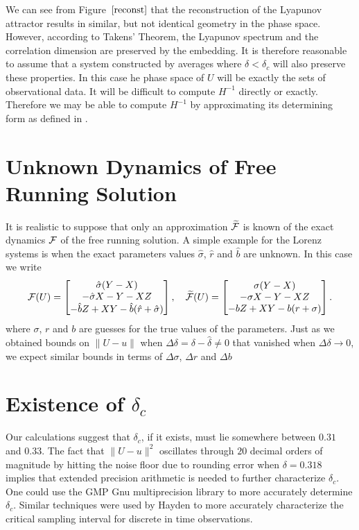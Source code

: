 \documentclass[master,tocprelim,12pt]{unrthesis}
\theoremstyle{definition}
\numberwithin{equation}{chapter}
\begin{document}
\begin{manuscript}
We can see from Figure~$\ref{reconst}$ that the reconstruction of the Lyapunov
attractor results in similar, but not identical geometry in the phase space. 
However, according to Takens' Theorem, the Lyapunov spectrum and the correlation
dimension are preserved by the embedding. It is therefore reasonable to assume
that a system constructed by averages where $\delta < \delta_c$ will also
preserve these properties. In this case he phase space of $U$ will be exactly
the sets of observational data. It will be difficult to compute $H^{-1}$
directly or exactly. Therefore we may be able to compute $H^{-1}$ by
approximating its determining form as defined in \cite{Jolly15}.

\section{Unknown Dynamics of Free Running Solution}
\label{whatissigma}
It is realistic to suppose that only an approximation $\widetilde{\cal F}$
is known of the exact dynamics ${\cal F}$ of the free running solution.
A simple example for the Lorenz systems is when
the exact parameters values $\hat\sigma$, $\hat r$ and $\hat b$ are 
unknown.
In this case we write
\begin{align*}
	{\cal F}(U)=
    \begin{bmatrix}\hat\sigma(Y-X)\\
    -\hat\sigma X-Y-XZ\\ -\hat bZ+XY-\hat b(\hat r+\hat\sigma)\end{bmatrix},
\quad
	\widetilde {\cal F}(U)=
    \begin{bmatrix}\sigma(Y-X)\\
    -\sigma X-Y-XZ\\ -bZ+XY-b(r+\sigma)\end{bmatrix}.
\end{align*}
where $\sigma$, $r$ and $b$ are guesses for the
true values of the parameters.  Just as we obtained bounds on
$\|U-u\|$ when $\Delta\delta=\delta-\hat\delta\ne 0$ that vanished when 
$\Delta\delta\to 0$, we expect similar bounds in terms of
$\Delta\sigma$, $\Delta r$ and $\Delta b$

\section{Existence of $\delta_c$}

Our calculations suggest that $\delta_c$, if it exists, must
lie somewhere between $0.31$ and $0.33$.  The fact that $\|U-u\|^2$
oscillates through $20$ decimal orders of magnitude by hitting
the noise floor due to rounding error when $\delta=0.318$ implies
that extended precision arithmetic is needed to further characterize
$\delta_c$.  One could use the GMP Gnu multiprecision library
to more accurately determine $\delta_c$.  Similar techniques were
used by Hayden \cite{HaydenThesis} to more accurately characterize 
the critical sampling interval for discrete in time observations.


\end{manuscript}
\end{document}
